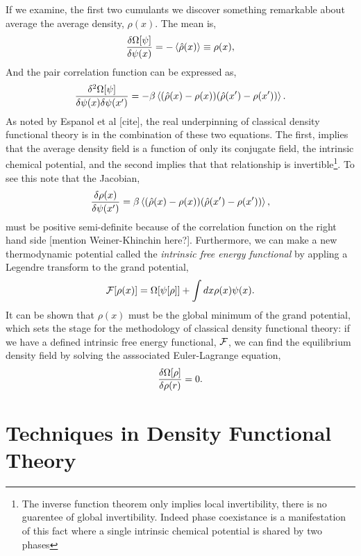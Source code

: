 If we examine, the first two cumulants we discover something remarkable about average the average density, $\rho(x)$. The mean is,
%
\begin{equation}
    \frac{\delta \Omega[\psi]}{\delta \psi(x)} = -\left\langle \hat{\rho}(x) \right\rangle \equiv \rho(x),
\end{equation}
%
And the pair correlation function can be expressed as, 
%
\begin{equation}
    \frac{\delta^2 \Omega[\psi]}{\delta \psi(x) \delta \psi(x^\prime)} = - \beta \left\langle (\hat{\rho}(x) - \rho(x))(\hat{\rho}(x^\prime) - \rho(x^\prime)) \right\rangle.
\end{equation}
%
As noted by Espanol et al [cite], the real underpinning of classical density functional theory is in the combination of these two equations.
The first, implies that the average density field is a function of only its conjugate field, the intrinsic chemical potential, and the second implies that that relationship is invertible\footnote{The inverse function theorem only implies local invertibility, there is no guarentee of global invertibility. Indeed phase coexistance is a manifestation of this fact where a single intrinsic chemical potential is shared by two phases}.
To see this note that the Jacobian, 
%
\begin{equation}
    \frac{\delta \rho(x)}{\delta \psi(x^\prime)} = \beta \left\langle  (\hat{\rho}(x) - \rho(x))(\hat{\rho}(x^\prime) - \rho(x^\prime)) \right\rangle, 
\end{equation}
%
must be positive semi-definite because of the correlation function on the right 
hand side [mention Weiner-Khinchin here?]. Furthermore, we can make a new thermodynamic potential called the \textit{intrinsic free energy functional} by appling a Legendre transform to the grand potential,
%
\begin{equation}
    \mathcal{F}[\rho(x)] = \Omega[\psi[\rho]] + \int dx \rho(x) \psi(x).
\end{equation}
%
It can be shown \cite{HansenAppendixB} that $\rho(x)$ must be the global minimum of the grand potential, which sets the stage for the methodology of classical density functional theory: if we have a defined intrinsic free energy functional, $\mathcal{F}$, we can find the equilibrium density field by solving the asssociated Euler-Lagrange equation, 
%
\begin{equation}
    \frac{\delta \Omega[\rho]}{\delta \rho(r)} = 0.
\end{equation}

\section{Techniques in Density Functional Theory} %

